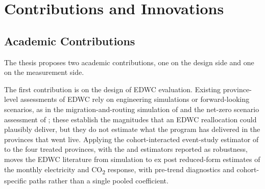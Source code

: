 \documentclass[12pt,a4paper]{article}
\begin{document}

\section{Contributions and Innovations}

\subsection{Academic Contributions}
%
%
%

The thesis proposes two academic contributions, one on the design
side and one on the measurement side.

The first contribution is on the design of EDWC evaluation. Existing
province-level assessments of EDWC rely on engineering simulations or
forward-looking scenarios, as in the migration-and-routing simulation
of \citet{zhangetal-2025-decarbonizingdatacenters} and the net-zero
scenario assessment of \citet{zhangetal-2025-easterndatawestern};
these establish the magnitudes that an EDWC reallocation could
plausibly deliver, but they do not estimate what the program has
delivered in the provinces that went live. Applying the cohort-interacted
event-study estimator of
\citet{sunabraham-2021-estimatingdynamictreatmenta} to the four
treated provinces, with the
\citet{callawaysantanna-2021-differenceindifferencesmultipletimea}
and \citet{borusyaketal-2024-revisitingeventstudydesigns} estimators
reported as robustness, moves the EDWC literature from simulation to
ex post reduced-form estimates of the monthly electricity and
CO\textsubscript{2} response, with pre-trend diagnostics and
cohort-specific paths rather than a single pooled coefficient.
\end{document}

